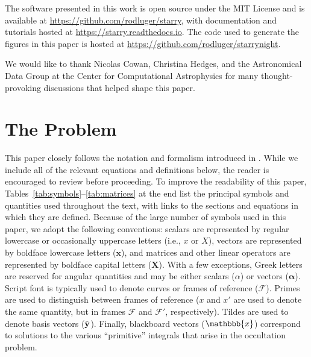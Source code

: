 \documentclass[modern]{aastex62}
\begin{document}
\vspace{1em}

The software presented in this work is open source under the MIT License and
is available at \url{https://github.com/rodluger/starry}, with documentation
and tutorials hosted at \url{https://starry.readthedocs.io}.
The code used to generate the figures in this paper is hosted
at \url{https://github.com/rodluger/starrynight}.


\vspace{1em}

We would like to thank Nicolas Cowan, Christina Hedges, and the
Astronomical Data Group at the Center for Computational Astrophysics for
many thought-provoking discussions that helped shape this paper.




\appendix

%

\section{The Problem}
\label{sec:the-problem}
%
This paper closely follows the
notation and formalism introduced in \citet{Luger2019}. While we
include all of the relevant equations and definitions below,
the reader is encouraged to
review \citet{Luger2019} before proceeding.
To improve the readability of this paper,
Tables~\ref{tab:symbols}--\ref{tab:matrices} at the end list the principal
symbols and quantities used throughout the text, with links to the
sections and equations in which they are defined.
Because of the large number of symbols used in this paper, we adopt
the following conventions: scalars are represented by regular lowercase or
occasionally uppercase letters (i.e., $x$ or $X$), vectors are
represented by boldface lowercase letters
($\mathbf{x}$), and matrices and other linear operators are represented
by boldface capital letters ($\mathbf{X}$).
With a few exceptions,
Greek letters are reserved for angular quantities and may be either
scalars ($\alpha$) or vectors ($\pmb{\alpha}$).
Script font is typically used to denote curves or frames of reference
($\mathcal{F}$). Primes are used to
distinguish between frames of reference ($x$ and $x'$ are used
to denote the same quantity, but in frames $\mathcal{F}$ and $\mathcal{F}'$,
respectively). Tildes are used to denote basis vectors ($\tilde{\mathbf{y}}$). Finally,
blackboard vectors ($\mathbbb{x}$) correspond to solutions
to the various ``primitive'' integrals that arise in the occultation
problem.
\end{document}
